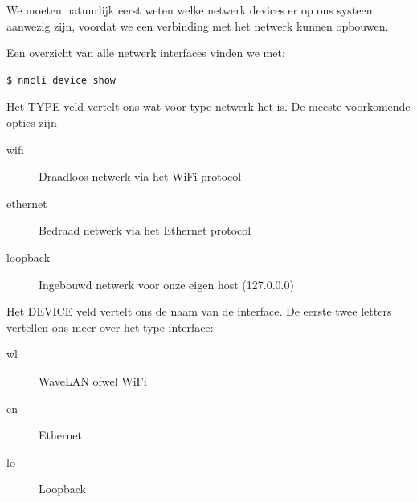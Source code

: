We moeten natuurlijk eerst weten welke netwerk devices er op ons systeem aanwezig zijn, voordat we een verbinding met het netwerk kunnen opbouwen.

Een overzicht van alle netwerk interfaces vinden we met:
\begin{lstlisting}[language=bash]
$ nmcli device show
\end{lstlisting}

Het TYPE veld vertelt ons wat voor type netwerk het is. De meeste voorkomende opties zijn
\begin{description}
\item[wifi] Draadloos netwerk via het WiFi protocol
\item[ethernet] Bedraad netwerk via het Ethernet protocol
\item[loopback] Ingebouwd netwerk voor onze eigen host (127.0.0.0)
\end{description}

Het DEVICE veld vertelt ons de naam van de interface. De eerste twee letters vertellen ons meer over het type interface:
\begin{description}
\item[wl] WaveLAN ofwel WiFi
\item[en] Ethernet
\item[lo] Loopback
\end{description}

